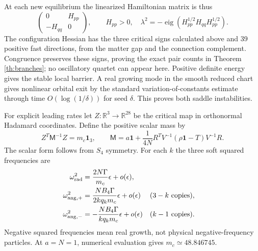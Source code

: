 \documentclass[11pt,a4paper]{article}
\newcommand{\id}{\mathbf1}\newcommand{\tr}{\operatorname{tr}}\newcommand{\diag}{\operatorname{diag}}\newcommand{\Rea}{\operatorname{Re}}
\begin{document}
At each new equilibrium the linearized Hamiltonian matrix is thus
\[
\begin{pmatrix}0&H_{pp}\\-H_{qq}&0\end{pmatrix},\qquad H_{pp}>0,
\quad\lambda^2=-\operatorname{eig}(H_{pp}^{1/2}H_{qq}H_{pp}^{1/2}).
\]
The configuration Hessian has the three critical signs calculated above and 39 positive fast directions, from the matter gap and the connection complement. Congruence preserves these signs, proving the exact pair counts in Theorem \ref{th:branches}; no oscillatory quartet can appear here. Positive definite energy gives the stable local barrier. A real growing mode in the smooth reduced chart gives nonlinear orbital exit by the standard variation-of-constants estimate through time $O(\log(1/\delta))$ for seed $\delta$. This proves both saddle instabilities.

For explicit leading rates let $Z:\mathbb R^3\to\mathbb R^{28}$ be the critical map in orthonormal Hadamard coordinates. Define the positive scalar mass by
\[
Z^T\mathsf M^{-1}Z=m_c\id_3,\qquad
\mathsf M=a\id+\frac1{4N}R^TV^{-1}(\rho\id-T)V^{-1}R.
\]
The scalar form follows from $S_4$ symmetry. For each $k$ the three soft squared frequencies are
\begin{align*}
\omega_{\rm rad}^2&=\frac{2N\Gamma}{m_c}\epsilon+o(\epsilon),\\
\omega_{\rm ang,+}^2&=\frac{NB_4\Gamma}{2kq_km_c}\epsilon+o(\epsilon)
&&\text{($3-k$ copies)},\\
\omega_{\rm ang,-}^2&=-\frac{NB_4\Gamma}{kq_km_c}\epsilon+o(\epsilon)
&&\text{($k-1$ copies)}.
\end{align*}
Negative squared frequencies mean real growth, not physical negative-frequency particles. At $a=N=1$, numerical evaluation gives $m_c\simeq48.846745$.

\newpage
\end{document}
